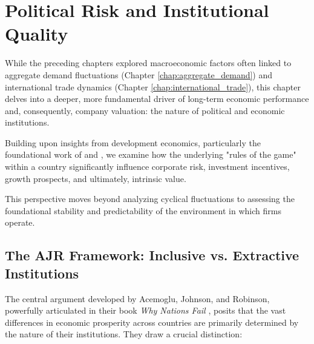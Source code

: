 \chapter{Political Risk and Institutional Quality}
\label{chap:political_risk}

While the preceding chapters explored macroeconomic factors often linked to aggregate demand fluctuations (Chapter \ref{chap:aggregate_demand}) and international trade dynamics (Chapter \ref{chap:international_trade}), this chapter delves into a deeper, more fundamental driver of long-term economic performance and, consequently, company valuation: the nature of political and economic institutions.

Building upon insights from development economics, particularly the foundational work of \textcite{acemoglu2001colonial} and \textcite{acemoglu2005institutions}, we examine how the underlying "rules of the game" within a country significantly influence corporate risk, investment incentives, growth prospects, and ultimately, intrinsic value.

This perspective moves beyond analyzing cyclical fluctuations to assessing the foundational stability and predictability of the environment in which firms operate.

\section{The AJR Framework: Inclusive vs. Extractive Institutions} \label{sec:ajr_framework}

The central argument developed by Acemoglu, Johnson, and Robinson, powerfully articulated in their book \textit{Why Nations Fail} \parencite{acemoglu2012nations}, posits that the vast differences in economic prosperity across countries are primarily determined by the nature of their institutions. They draw a crucial distinction:


